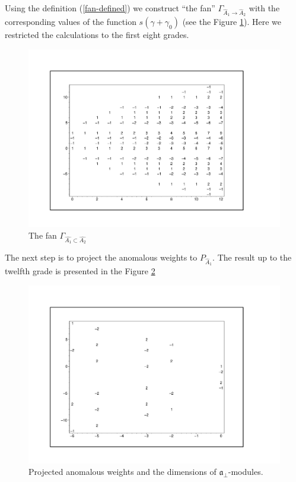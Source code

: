 \documentclass[a4paper,12pt]{article}
\theoremstyle{definition} \newtheorem{Def}{Definition}
\begin{document}
Using the definition (\ref{fan-defined})  we construct ``the fan'' $\Gamma_{\hat A_1\to\hat A_2}$  with the corresponding values of the function $s(\gamma+\gamma_0)$ (see the Figure \ref{fig:AffineA2A1Fan}). 
Here we restricted the calculations to the first eight grades.
\begin{figure}[h!tb]
  \centering
  \includegraphics[width=130mm]{AffineA2_A1_fan.pdf}
  \caption{The fan $\Gamma_{\hat{A_1}\subset \hat{A_2}}$}
  \label{fig:AffineA2A1Fan}
\end{figure}

The next step is to project the anomalous weights to $P_{\hat A_1}$.
The result up to the twelfth grade is presented in the Figure \ref{fig:AffineA2_A1_anom_proj}
\begin{figure}[h!tb]
  \centering
  \includegraphics[width=150mm]{AffineA2_A1_proj_anom.pdf}
  \caption{Projected anomalous weights and the dimensions of $\mathfrak{a}_{\bot}$-modules.}
  \label{fig:AffineA2_A1_anom_proj}
\end{figure}
\end{document}
